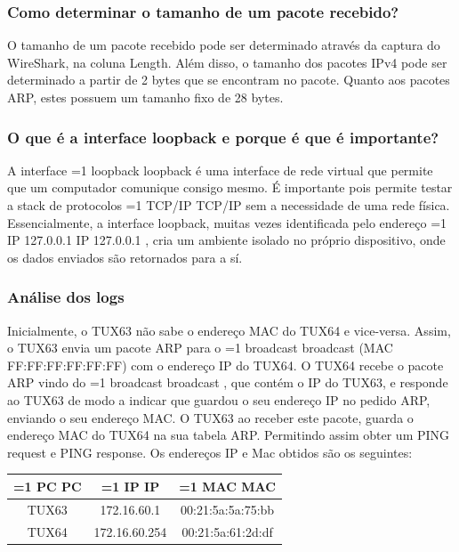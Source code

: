 \documentclass[11pt,a4paper,twocolumn]{article}
\newcommand{\hl}[2][1]{%
  \ifnum#1=1\relax
    \textcolor{text-hl1}{#2}%
  \else
    \textcolor{text-hl2}{#2}%
  \fi
}
\begin{document}
\subsubsection{Como determinar o tamanho de um pacote recebido?}

O tamanho de um pacote recebido pode ser determinado através da captura do WireShark, na coluna Length. Além disso, o tamanho dos pacotes IPv4 pode ser determinado a partir de 2 bytes que se encontram no pacote. Quanto aos pacotes ARP, estes possuem um tamanho fixo de 28 bytes.

\subsubsection{O que é a interface loopback e porque é que é importante?}

A interface \hl{loopback} é uma interface de rede virtual que permite que um computador comunique consigo mesmo. É importante pois permite testar a stack de protocolos \hl[2]{TCP/IP} sem a necessidade de uma rede física. Essencialmente, a interface loopback, muitas vezes identificada pelo endereço \hl[2]{IP 127.0.0.1}, cria um ambiente isolado no próprio dispositivo, onde os dados enviados são retornados para a sí.

\subsubsection{Análise dos logs}\label{sec:analise-logs}

Inicialmente, o TUX63 não sabe o endereço MAC do TUX64 e vice-versa. Assim, o TUX63 envia um pacote ARP para o \hl{broadcast} (MAC FF:FF:FF:FF:FF:FF) com o endereço IP do TUX64. O TUX64 recebe o pacote ARP vindo do \hl{broadcast}, que contém o IP do TUX63, e responde ao TUX63 de modo a indicar que guardou o seu endereço IP no pedido ARP, enviando o seu endereço MAC. O TUX63 ao receber este pacote, guarda o endereço MAC do TUX64 na sua tabela ARP. Permitindo assim obter um PING request e PING response.
Os endereços IP e Mac obtidos são os seguintes:

\begin{table}[H]
    \centering
    \begin{tabular}{|c|c|c|}
        \hline
    \hl{PC} & \hl{IP} & \hl{MAC} \\ \hline
    TUX63 & 172.16.60.1 & 00:21:5a:5a:75:bb  \\
    TUX64 & 172.16.60.254 & 00:21:5a:61:2d:df \\
    \end{tabular}
\end{table}
\end{document}
